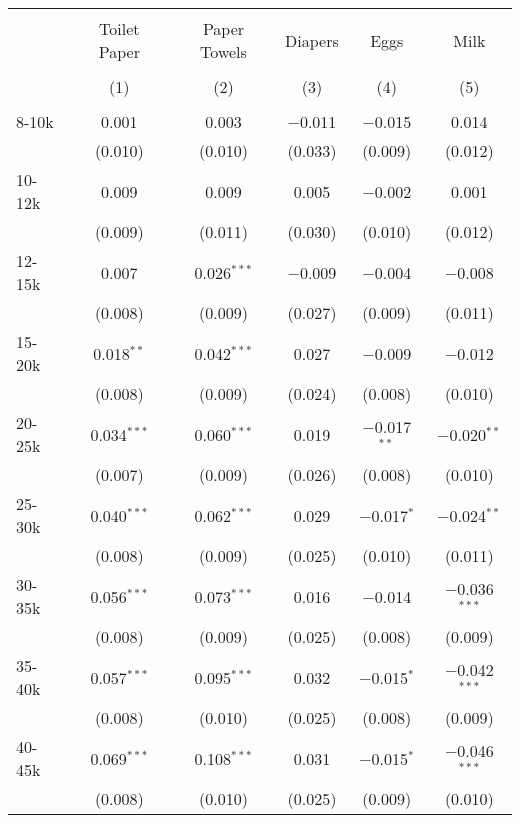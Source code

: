 
\begin{table}[!htbp] \centering 
  \caption{} 
  \label{} 
\begin{tabular}{@{\extracolsep{5pt}}lccccc} 
\\[-1.8ex]\hline 
\hline \\[-1.8ex] 
 & Toilet Paper & Paper Towels & Diapers & Eggs & Milk \\ 
\\[-1.8ex] & (1) & (2) & (3) & (4) & (5)\\ 
\hline \\[-1.8ex] 
 8-10k & 0.001 & 0.003 & $-$0.011 & $-$0.015 & 0.014 \\ 
  & (0.010) & (0.010) & (0.033) & (0.009) & (0.012) \\ 
  10-12k & 0.009 & 0.009 & 0.005 & $-$0.002 & 0.001 \\ 
  & (0.009) & (0.011) & (0.030) & (0.010) & (0.012) \\ 
  12-15k & 0.007 & 0.026$^{***}$ & $-$0.009 & $-$0.004 & $-$0.008 \\ 
  & (0.008) & (0.009) & (0.027) & (0.009) & (0.011) \\ 
  15-20k & 0.018$^{**}$ & 0.042$^{***}$ & 0.027 & $-$0.009 & $-$0.012 \\ 
  & (0.008) & (0.009) & (0.024) & (0.008) & (0.010) \\ 
  20-25k & 0.034$^{***}$ & 0.060$^{***}$ & 0.019 & $-$0.017$^{**}$ & $-$0.020$^{**}$ \\ 
  & (0.007) & (0.009) & (0.026) & (0.008) & (0.010) \\ 
  25-30k & 0.040$^{***}$ & 0.062$^{***}$ & 0.029 & $-$0.017$^{*}$ & $-$0.024$^{**}$ \\ 
  & (0.008) & (0.009) & (0.025) & (0.010) & (0.011) \\ 
  30-35k & 0.056$^{***}$ & 0.073$^{***}$ & 0.016 & $-$0.014 & $-$0.036$^{***}$ \\ 
  & (0.008) & (0.009) & (0.025) & (0.008) & (0.009) \\ 
  35-40k & 0.057$^{***}$ & 0.095$^{***}$ & 0.032 & $-$0.015$^{*}$ & $-$0.042$^{***}$ \\ 
  & (0.008) & (0.010) & (0.025) & (0.008) & (0.009) \\ 
  40-45k & 0.069$^{***}$ & 0.108$^{***}$ & 0.031 & $-$0.015$^{*}$ & $-$0.046$^{***}$ \\ 
  & (0.008) & (0.010) & (0.025) & (0.009) & (0.010) \\ 

\end{tabular}
\end{table}
